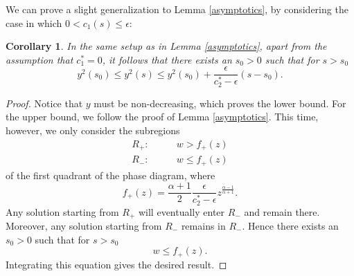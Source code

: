 \documentclass{amsart}
\newtheorem{cor}[thm]{Corollary}
\theoremstyle{definition}
\theoremstyle{remark}
\numberwithin{equation}{section}
\begin{document}
We can prove a slight generalization to Lemma \ref{asymptotics}, by considering the case in which $0< c_1(s) \leq \epsilon$:


\begin{cor}
\label{asymptotics_cor}
In the same setup as in Lemma \ref{asymptotics}, apart from the assumption that $c_1^{\ast} = 0$, it follows that there exists an $s_0 >0$ such that for $s > s_0$
\begin{equation*}
y^2(s_0) \leq y^2(s) \leq y^2(s_0) + \frac{\epsilon}{c_2^{\ast}-\epsilon}\left(s-s_0\right).
\end{equation*}
\end{cor}
\begin{proof}
Notice that $y$ must be non-decreasing, which proves the lower bound. For the upper bound, we follow the proof of Lemma \ref{asymptotics}. This time, however, we only consider the subregions 
\begin{align*}
R_+:&\qquad    w > f_+(z) \\ 
R_-:&\qquad    w \leq f_+(z)
\end{align*}
of the first quadrant of the phase diagram, where 
\begin{equation*}
f_+(z) = \frac{\alpha+1}{2} \frac{\epsilon}{c_2^{\ast} - \epsilon} z ^ {\frac{\alpha-1}{\alpha+1}}.
\end{equation*}
Any solution starting from $R_+$ will eventually enter $R_-$ and remain there. Moreover, any solution starting from $R_-$ remains in $R_-$. Hence there exists an $s_0 > 0$ such that for $s > s_0$
\begin{equation*}
w \leq f_+(z).
\end{equation*}
Integrating this equation gives the desired result.
\end{proof}
\end{document}

